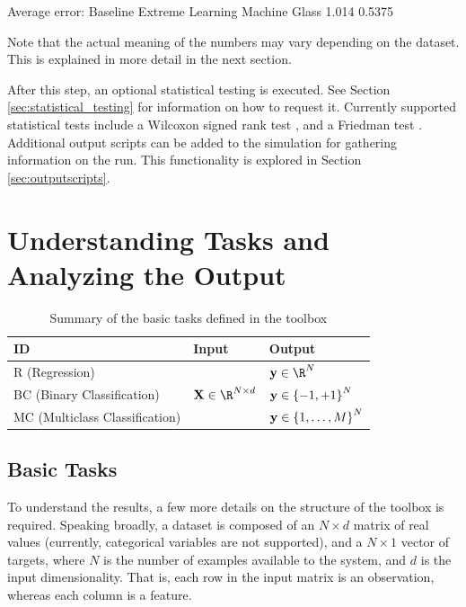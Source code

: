 \begin{console}
Average error:
       Baseline  Extreme Learning Machine
Glass     1.014                    0.5375
\end{console}

Note that the actual meaning of the numbers may vary depending on the dataset. This is explained in more detail in the next section.

After this step, an optional statistical testing is executed. See Section \ref{sec:statistical_testing} for information on how to request it. Currently supported statistical tests include a Wilcoxon signed rank test \cite{dietterich1998approximate}, and a Friedman test \cite{demvsar2006statistical}. Additional output scripts can be added to the simulation for gathering information on the run. This functionality is explored in Section \ref{sec:outputscripts}.

\section{Understanding Tasks and Analyzing the Output}
\label{sec:understandingtasks}

\vspace{-2em}

\begin{center}
\begin{table}
{\centering\hfill{}
\begin{tabular}{lll}
\toprule
ID & Input & Output \\ 
\midrule
R (Regression) & \multirow{3}{*}{$\vect{X} \in \R^{N \times d}$ } & $\vect{y} \in \R^N$ \\
BC (Binary Classification) & & $\mathbf{y} \in \left\{-1,+1\right\}^N$\\
MC (Multiclass Classification) & & $\mathbf{y} \in \left\{1,\dots,M\right\}^N$\\
\bottomrule
\end{tabular}}
\hfill{}
\caption{Summary of the basic tasks defined in the toolbox}
\label{tab:basictasks}
\end{table}
\end{center}

\subsection{Basic Tasks}

To understand the results, a few more details on the structure of the toolbox is required. Speaking broadly, a dataset is composed of an $N \times d$ matrix of real values (currently, categorical variables are not supported), and a $N \times 1$ vector of targets, where $N$ is the number of examples available to the system, and $d$ is the input dimensionality. That is, each row in the input matrix is an observation, whereas each column is a feature.

